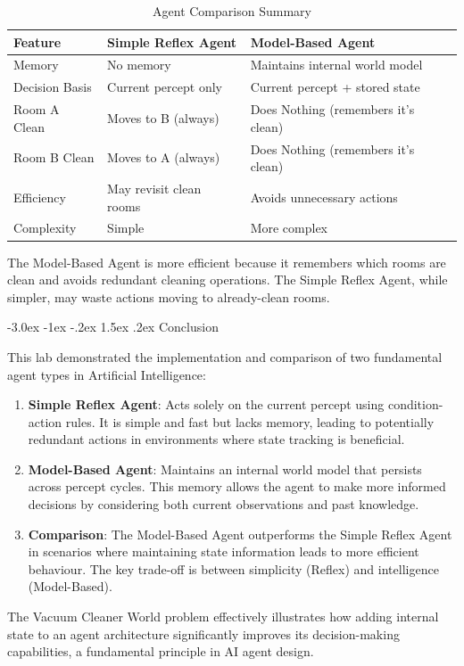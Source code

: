 \documentclass[12pt,a4paper]{article}
\makeatletter
\renewcommand{\section}{\@startsection{section}{1}{\z@}%
  {-3.0ex \@plus -1ex \@minus -.2ex}%
  {1.5ex \@plus.2ex}%
  {\normalfont\Large\bfseries\color{primaryblue}}}
\makeatother
\begin{document}
\begin{table}[H]
\centering
\caption{Agent Comparison Summary}
\begin{tabularx}{\textwidth}{@{}lXX@{}}
\toprule
\textbf{Feature} & \textbf{Simple Reflex Agent} & \textbf{Model-Based Agent} \\
\midrule
Memory & No memory & Maintains internal world model \\
Decision Basis & Current percept only & Current percept + stored state \\
Room A Clean & Moves to B (always) & Does Nothing (remembers it's clean) \\
Room B Clean & Moves to A (always) & Does Nothing (remembers it's clean) \\
Efficiency & May revisit clean rooms & Avoids unnecessary actions \\
Complexity & Simple & More complex \\
\bottomrule
\end{tabularx}
\end{table}

The Model-Based Agent is more efficient because it remembers which rooms are clean and avoids redundant cleaning operations. The Simple Reflex Agent, while simpler, may waste actions moving to already-clean rooms.

\newpage
\section{Conclusion}

This lab demonstrated the implementation and comparison of two fundamental agent types in Artificial Intelligence:

\begin{enumerate}
  \item \textbf{Simple Reflex Agent}: Acts solely on the current percept using condition-action rules. It is simple and fast but lacks memory, leading to potentially redundant actions in environments where state tracking is beneficial.

  \item \textbf{Model-Based Agent}: Maintains an internal world model that persists across percept cycles. This memory allows the agent to make more informed decisions by considering both current observations and past knowledge.

  \item \textbf{Comparison}: The Model-Based Agent outperforms the Simple Reflex Agent in scenarios where maintaining state information leads to more efficient behaviour. The key trade-off is between simplicity (Reflex) and intelligence (Model-Based).
\end{enumerate}

The Vacuum Cleaner World problem effectively illustrates how adding internal state to an agent architecture significantly improves its decision-making capabilities, a fundamental principle in AI agent design.
\end{document}
